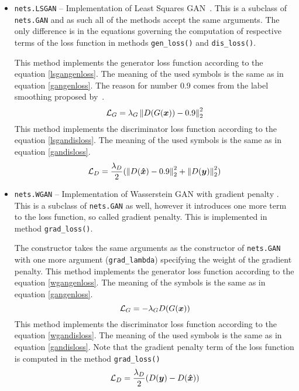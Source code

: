 \begin{itemize}
\item \texttt{nets.LSGAN} -- Implementation of Least Squares GAN~\cite{lsgan}. This is a subclass of \texttt{nets.GAN} and as such all of the methods accept the same arguments. The only difference is in the equations governing the computation of respective terms of the loss function in methods \texttt{gen\_loss()} and \texttt{dis\_loss()}.
\begin{description}
 This method implements the generator loss function according to the equation \ref{lsgangenloss}. The meaning of the used symbols is the same as in equation \ref{gangenloss}. The reason for number 0.9 comes from the label smoothing proposed by~\cite{improvedgan,smooth}.
\begin{equation}
\mathcal{L}_G = \lambda_G \left\lVert D(G(\bm{x})) - 0.9\right\rVert_2^2
\label{lsgangenloss}
\end{equation}
 This  method implements the discriminator loss function according to the equation \ref{lsgandisloss}. The meaning of the used symbols is the same as in equation \ref{gandisloss}.
\begin{equation}
\mathcal{L}_D = \frac{\lambda_D}{2} (\left\lVert D(\bm{\hat{x}}) - 0.9\right\rVert_2^2 + \left\lVert D(\bm{y})\right\rVert_2^2)
\label{lsgandisloss}
\end{equation}

\end{description}
\item \texttt{nets.WGAN} -- Implementation of Wasserstein GAN with gradient penalty \cite{wgan-gp}. This is a subclass of \texttt{nets.GAN} as well, however it introduces one more term to the loss function, so called gradient penalty. This is implemented in method \texttt{grad\_loss()}.
\begin{description}
 The constructor takes the same arguments as the constructor of \texttt{nets.GAN} with one more argument (\texttt{grad\_lambda}) specifying the weight of the gradient penalty.
 This method implements the generator loss function according to the equation \ref{wgangenloss}. The meaning of the symbols is the same as in equation \ref{gangenloss}.
\begin{equation}
\mathcal{L}_G = -\lambda_GD(G(\bm{x}))
\label{wgangenloss}
\end{equation}
 This method implements the discriminator loss function according to the equation \ref{wgandisloss}. The meaning of the used symbols is the same as in equation \ref{gandisloss}. Note that the gradient penalty term of the loss function is computed in the method \texttt{grad\_loss()}
\begin{equation}
\mathcal{L}_D = \frac{\lambda_D}{2}(D(\bm{y}) - D(\bm{\hat{x}}))
\label{wgandisloss}
\end{equation}


\end{description}
\end{itemize}

